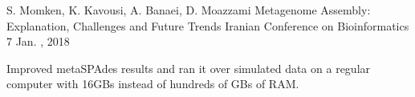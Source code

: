 

\begin{cventries}

  \cventry
    {S. Momken, K. Kavousi, A. Banaei, D. Moazzami} %
    {Metagenome Assembly: Explanation, Challenges and Future Trends} %
    {Iranian Conference on Bioinformatics 7} %
    {Jan. , 2018} %
    { %
      \item {Improved metaSPAdes results and ran it over simulated data on a regular computer with 16GBs instead of hundreds of GBs of RAM.}
    }

\end{cventries}
